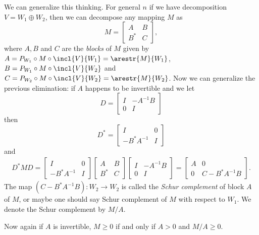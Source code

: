 We can generalize this thinking. For general $n$ if we have decomposition $V = W_{1} \oplus W_{2}$, then we can decompose any mapping $M$ as
\[
	M =
	\begin{bmatrix}
		A & B \\
		B^{*} & C
	\end{bmatrix},
\]
where $A, B$ and $C$ are the \textit{blocks} of $M$ given by $A = P_{W_{1}} \circ M \circ \incl{V}{W_{1}} = \arestr{M}{W_{1}}$, $B = P_{W_{1}} \circ M \circ \incl{V}{W_{2}}$ and $C = P_{W_{2}} \circ M \circ \incl{V}{W_{2}} = \arestr{M}{W_{2}}$. Now we can generalize the previous elimination: if $A$ happens to be invertible and we let
\[
	D =
	\begin{bmatrix}
		I & -A^{-1} B \\
		0 & I
	\end{bmatrix}
\]
then
\[
	D^{*} =
	\begin{bmatrix}
		I & 0 \\
		-B^{*} A^{-1}  & I
	\end{bmatrix}
\]
and
\begin{align}\label{schur_complement}
	D^{*} M D =
	\begin{bmatrix}
		I & 0 \\
		-B^{*} A^{-1}  & I
	\end{bmatrix}
	\begin{bmatrix}
		A & B \\
		B^{*} & C
	\end{bmatrix}
	\begin{bmatrix}
		I & -A^{-1} B \\
		0 & I
	\end{bmatrix}
	=
	\begin{bmatrix}
		A & 0 \\
		0 & C - B^{*} A^{-1} B
	\end{bmatrix}.
\end{align}
The map $(C - B^{*} A^{-1} B) : W_{2} \to W_{2}$ is called the \textit{Schur complement} of block $A$ of $M$, or maybe one should say Schur complement of $M$ with respect to $W_{1}$. We denote the Schur complement by $M/A$.

Now again if $A$ is invertible, $M \geq 0$ if and only if $A > 0$ and $M/A \geq 0$.

